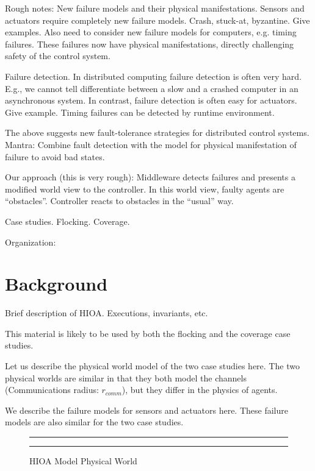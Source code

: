 \documentclass[10pt, conference, compsocconf]{IEEEtran}
\begin{document}
Rough notes:
New failure models and their physical manifestations.
Sensors and actuators require completely new failure models.
Crash, stuck-at, byzantine.
%
Give examples.
%
Also need to consider new failure models for computers, e.g.
timing failures. 
%
These failures now have physical manifestations, 
directly challenging safety of the control system.

Failure detection.
In distributed computing failure detection is often very hard.
E.g., we cannot tell differentiate between a slow and
a crashed computer in an asynchronous system.
In contrast, failure detection is often easy 
for actuators. Give example.  
Timing failures can be detected by runtime environment.

The above suggests new fault-tolerance strategies
for distributed control systems.
Mantra: 
Combine fault detection with the model for physical manifestation
of failure to avoid bad states. 

Our approach (this is very rough):
Middleware detects failures and presents a modified 
world view to the controller. In this world view, faulty agents
are ``obstacles''. Controller reacts to obstacles in the ``usual'' way.

Case studies. Flocking. Coverage.

Organization:

\section{Background}
\label{sec:basics}
Brief description of HIOA.
Executions, invariants, etc.

This material is likely to be used by 
both the flocking and the coverage 
case studies.

%
Let us describe the 
physical world model of the two case studies here.
%
The two physical worlds are similar in that
they both model the channels (Communications radius: $r_{comm}$), 
but they differ in the physics of agents. 
%


We describe the failure models for sensors 
and actuators here. These failure models are also 
similar for the two case studies. 

\begin{figure}[h!]
\centering
  \hrule
  {}
  \hrule
  \caption{HIOA Model Physical World}
  \label{fig:physicalWorld}
\end{figure}
\end{document}
